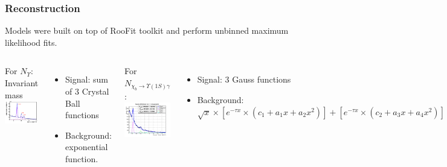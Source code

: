 \documentclass{beamer}
\begin{document}
\begin{frame}[t]
\frametitle{Reconstruction}
Models were built on top of RooFit toolkit and perform unbinned maximum likelihood fits.
\begin{columns}[t]
For $N_{\Upsilon}$:
Invariant mass
\includegraphics[height=.35\textheight]{images/ups.png}\\~\\
\begin{itemize}
  \item Signal: sum of 3 Crystal Ball functions
  \item Background: exponential function.
\end{itemize}
For $N_{\chi_{b} \rightarrow \Upsilon(1S) \gamma}$:
\includegraphics[height=.35\textheight]{images/fit.png}\\~\\
\begin{itemize}
  \item Signal: 3 Gauss functions
  \item Background: $\sqrt{x} \times \left[e^{- \tau x} \times (c_1+a_1x+a_2x^2)\right] + \left[e^{-\tau x} \times (c_2+a_3x+a_4x^2)\right]$
\end{itemize}
\end{columns}
\end{frame}
\end{document}
